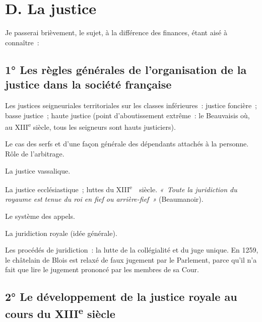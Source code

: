 \documentclass[french,twoside]{book} %
\begin{document}
\section[{D. La justice }]{D. La justice \protect\footnotemark }
\label{c04d}
\noindent Je passerai brièvement, le sujet, à la différence des finances, étant aisé à connaître :\par
\subsection[{1° Les règles générales de l’organisation de la justice dans la société française}]{1° Les règles générales de l’organisation de la justice dans la société française}

\begin{listalpha}[itemsep=0pt,]
\item Les justices seigneuriales territoriales sur les classes inférieures : justice foncière ; basse justice ; haute justice (point d’aboutissement extrême : le Beauvaisis où, au XIII\textsuperscript{e} siècle, tous les seigneurs sont hauts justiciers).
\item Le cas des serfs et d’une façon générale des dépendants attachés à la personne. Rôle de l’arbitrage.
\item La justice vassalique. 
\label{p43}
\item La justice ecclésiastique ; luttes du XIII\textsuperscript{e}  siècle. \emph{« Toute la juridiction du royaume est tenue du roi en fief ou arrière-fief »} (Beaumanoir).
\item Le système des appels.
\item La juridiction royale (idée générale).
\item Les procédés de juridiction : la lutte de la collégialité et du juge unique. En 1259, le châtelain de Blois est relaxé de faux jugement par le Parlement, parce qu’il n’a fait que lire le jugement prononcé par les membres de sa Cour.
\end{listalpha}

\subsection[{2° Le développement de la justice royale au cours du XIIIe siècle}]{2° Le développement de la justice royale au cours du XIII\textsuperscript{e} siècle}
\end{document}
